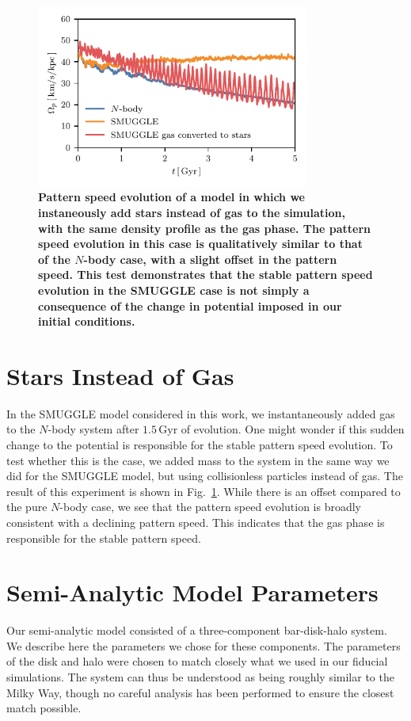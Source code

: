 \documentclass[twocolumn,linenumbers,trackchanges]{aastex631}
\begin{document}
\begin{figure}
    \centering
    \includegraphics[width=9cm]{fig/ps_star.pdf}
    \caption{{\bf Pattern speed evolution of a model in which we instaneously
    add stars instead of gas to the simulation, with the same density profile as
    the gas phase. The pattern speed evolution in this case is qualitatively
    similar to that of the $N$-body case, with a slight offset in the pattern
    speed. This test demonstrates that the stable pattern speed evolution in the
    SMUGGLE case is not simply a consequence of the change in potential imposed
    in our initial conditions.}}
\label{fig:ps-star}
\end{figure}

{\bf \section{Stars Instead of Gas}
In the SMUGGLE model considered in this work, we instantaneously added gas to
the $N$-body system after $1.5\,\textrm{Gyr}$ of evolution. One might wonder if
this sudden change to the potential is responsible for the stable pattern speed
evolution. To test whether this is the case, we added mass to the system in the
same way we did for the SMUGGLE model, but using collisionless particles instead
of gas. The result of this experiment is shown in Fig.~\ref{fig:ps-star}. While
there is an offset compared to the pure $N$-body case, we see that the pattern
speed evolution is broadly consistent with a declining pattern speed. This
indicates that the gas phase is responsible for the stable pattern speed.}
\section{Semi-Analytic Model Parameters}
\label{app:sam}
Our semi-analytic model consisted of a three-component bar-disk-halo system. We
describe here the parameters we chose for these components. The parameters of
the disk and halo were chosen to match closely what we used in our fiducial
simulations. The system can thus be understood as being roughly similar to the
Milky Way, though no careful analysis has been performed to ensure the closest
match possible.
\end{document}
